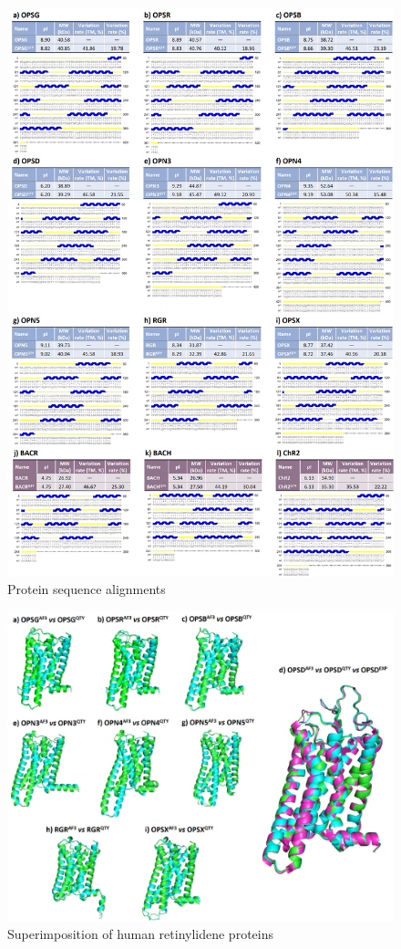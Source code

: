 \documentclass[fleqn,10pt,lineno]{manuscript}
\begin{document}
\begin{figure}[h]
	\centering
	\includegraphics[width=\linewidth]{figures/sequences.jpg}
	\caption{Protein sequence alignments}
	\label{fig:sequences}
\end{figure}

\begin{figure}[h]
	\centering
	\includegraphics[width=\linewidth]{figures/superimposition-human.jpg}
	\caption{Superimposition of human retinylidene proteins}
	\label{fig:humansup}
\end{figure}
\end{document}
